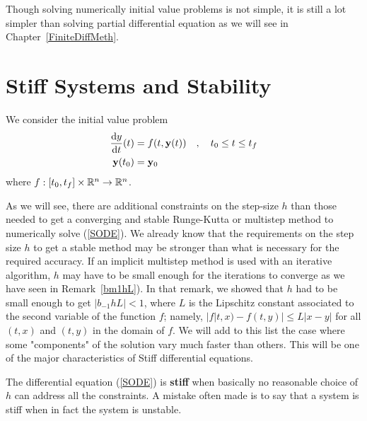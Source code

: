 Though solving numerically initial value problems is not simple, it is
still a lot simpler than solving partial differential equation as we
will see in Chapter~\ref{FiniteDiffMeth}.

\section{Stiff Systems and Stability}

We consider the initial value problem
\begin{equation} \label{SODE}
\begin{split}
\frac{\mathrm{d}y}{\mathrm{d}{t}}(t) &= f(t,\mathbf{y}(t)) \quad , \quad t_0 \leq t \leq t_f \\
\mathbf{y}(t_0) & = \mathbf{y}_0
\end{split}
\end{equation}
where $f:[t_0,t_f]\times\mathbb{R}^n \rightarrow \mathbb{R}^n$.

As we will see, there are additional constraints on the step-size $h$
than those needed to get a converging and stable Runge-Kutta or multistep
method to numerically solve (\ref{SODE}).  We already know that
the requirements on the step size $h$ to get a stable method
may be stronger than what is necessary for the required
accuracy.  If an implicit multistep method is used with an iterative algorithm,
$h$ may have to be small enough for the iterations to converge as we have seen
in Remark~\ref{bm1hL}).  In that remark, we showed that $h$ had to be small
enough to get $|b_{-1}hL| < 1$, where $L$ is the Lipschitz constant
associated to the second variable of the function $f$; namely,
$|f|t,x)-f(t,y)| \leq L |x - y|$ for all $(t,x)$ and $(t,y)$ in the
domain of $f$.  We will add to this list the case where some "components"
of the solution vary much faster than others.  This will be one of the
major characteristics of Stiff differential equations.

The differential equation (\ref{SODE}) is
{\bfseries stiff} when
basically no reasonable choice of $h$ can address all the constraints.
A mistake often made is to say that a system is stiff when in fact the
system is unstable.

